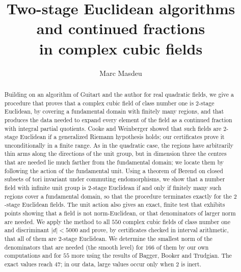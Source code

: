 \documentclass[11pt]{amsart}
\theoremstyle{definition}
\theoremstyle{remark}
\numberwithin{equation}{section}
\begin{document}
\title[Two-stage Euclidean algorithms in complex cubic fields]{Two-stage Euclidean algorithms and
continued fractions\\ in complex cubic fields}

\author{Marc Masdeu}
\address{Departament de Matem\`atiques, Universitat Aut\`onoma de Barcelona; Centre de Recerca Matemàtica}


\begin{abstract}
Building on an algorithm of Guitart and the author for real quadratic fields, we give a
procedure that proves that a complex cubic field of class number one is $2$-stage Euclidean,
by covering a fundamental domain with finitely many regions, and that produces the data needed
to expand every element of the field as a continued fraction with integral partial quotients.
Cooke and Weinberger showed that such fields are $2$-stage Euclidean if a generalized Riemann
hypothesis holds; our certificates prove it unconditionally in a finite range. As in the
quadratic case, the regions have arbitrarily thin arms along the directions of the unit group,
but in dimension three the centres that are needed lie much farther from the fundamental domain;
we locate them by following the action of the fundamental unit. Using a theorem of Berend on
closed subsets of tori invariant under commuting endomorphisms, we show that a number field
with infinite unit group is $2$-stage Euclidean if and only if finitely many such regions cover
a fundamental domain, so that the procedure terminates exactly for the $2$-stage Euclidean
fields. The unit action also gives an exact, finite test that exhibits points showing that a
field is not norm-Euclidean, or that denominators of larger norm are needed. We apply the
method to all $550$ complex cubic fields
of class number one and discriminant $|d|<5000$ and prove, by certificates checked in interval
arithmetic, that all of them are $2$-stage Euclidean. We determine the smallest norm of the
denominators that are needed (the smooth level) for $166$ of them by our own computations and
for $55$ more using the results of Bagger, Booker and Trudgian. The exact values reach $47$; in
our data, large values occur only when $2$ is inert.
\end{abstract}

\maketitle
\end{document}
